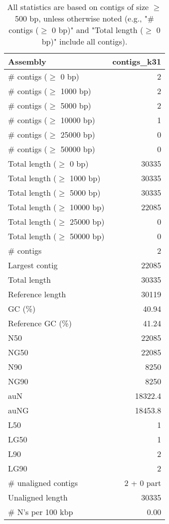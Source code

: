 \documentclass[12pt,a4paper]{article}
\begin{document}
\begin{table}[ht]
\begin{center}
\caption{All statistics are based on contigs of size $\geq$ 500 bp, unless otherwise noted (e.g., "\# contigs ($\geq$ 0 bp)" and "Total length ($\geq$ 0 bp)" include all contigs).}
\begin{tabular}{|l*{1}{|r}|}
\hline
Assembly & contigs\_k31 \\ \hline
\# contigs ($\geq$ 0 bp) & 2 \\ \hline
\# contigs ($\geq$ 1000 bp) & 2 \\ \hline
\# contigs ($\geq$ 5000 bp) & 2 \\ \hline
\# contigs ($\geq$ 10000 bp) & 1 \\ \hline
\# contigs ($\geq$ 25000 bp) & 0 \\ \hline
\# contigs ($\geq$ 50000 bp) & 0 \\ \hline
Total length ($\geq$ 0 bp) & 30335 \\ \hline
Total length ($\geq$ 1000 bp) & 30335 \\ \hline
Total length ($\geq$ 5000 bp) & 30335 \\ \hline
Total length ($\geq$ 10000 bp) & 22085 \\ \hline
Total length ($\geq$ 25000 bp) & 0 \\ \hline
Total length ($\geq$ 50000 bp) & 0 \\ \hline
\# contigs & 2 \\ \hline
Largest contig & 22085 \\ \hline
Total length & 30335 \\ \hline
Reference length & 30119 \\ \hline
GC (\%) & 40.94 \\ \hline
Reference GC (\%) & 41.24 \\ \hline
N50 & 22085 \\ \hline
NG50 & 22085 \\ \hline
N90 & 8250 \\ \hline
NG90 & 8250 \\ \hline
auN & 18322.4 \\ \hline
auNG & 18453.8 \\ \hline
L50 & 1 \\ \hline
LG50 & 1 \\ \hline
L90 & 2 \\ \hline
LG90 & 2 \\ \hline
\# unaligned contigs & 2 + 0 part \\ \hline
Unaligned length & 30335 \\ \hline
\# N's per 100 kbp & 0.00 \\ \hline
\end{tabular}
\end{center}
\end{table}
\end{document}
